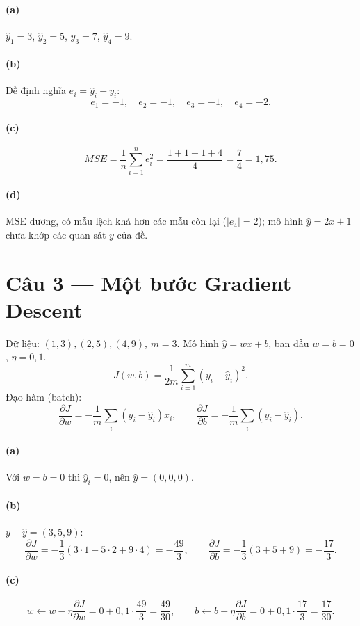 \paragraph{(a)} $\hat y_1=3$, $\hat y_2=5$, $\hat y_3=7$, $\hat y_4=9$.

\paragraph{(b)} Đề định nghĩa $e_i=\hat y_i-y_i$:
\[
e_1=-1,\quad e_2=-1,\quad e_3=-1,\quad e_4=-2.
\]

\paragraph{(c)}
\[
MSE=\frac{1}{n}\sum_{i=1}^n e_i^2=\frac{1+1+1+4}{4}=\frac{7}{4}=1{,}75.
\]

\paragraph{(d)} MSE dương, có mẫu lệch khá hơn các mẫu còn lại ($|e_4|=2$); mô hình $\hat y=2x+1$ chưa khớp các quan sát $y$ của đề.

\section*{Câu 3 --- Một bước Gradient Descent}
Dữ liệu: $(1,3),(2,5),(4,9)$, $m=3$. Mô hình $\hat y=wx+b$, ban đầu $w=b=0$, $\eta=0{,}1$.
\[
J(w,b)=\frac{1}{2m}\sum_{i=1}^m (y_i-\hat y_i)^2.
\]
Đạo hàm (batch):
\[
\frac{\partial J}{\partial w}=-\frac{1}{m}\sum_{i}(y_i-\hat y_i)x_i,\qquad
\frac{\partial J}{\partial b}=-\frac{1}{m}\sum_{i}(y_i-\hat y_i).
\]
\paragraph{(a)} Với $w=b=0$ thì $\hat y_i=0$, nên $\hat y=(0,0,0)$.

\paragraph{(b)} $y-\hat y=(3,5,9)$:
\[
\frac{\partial J}{\partial w}=-\frac13(3\cdot 1+5\cdot 2+9\cdot 4)=-\frac{49}{3},\qquad
\frac{\partial J}{\partial b}=-\frac13(3+5+9)=-\frac{17}{3}.
\]

\paragraph{(c)}
\[
w\leftarrow w-\eta\frac{\partial J}{\partial w}=0+0{,}1\cdot\frac{49}{3}=\frac{49}{30},\qquad
b\leftarrow b-\eta\frac{\partial J}{\partial b}=0+0{,}1\cdot\frac{17}{3}=\frac{17}{30}.
\]

